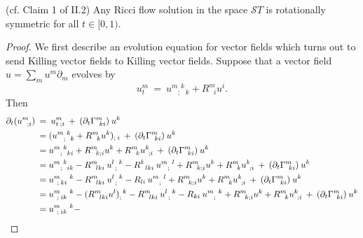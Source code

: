 \begin{lemma}
  \label{lem:kl-rotational-symmetry-standard-solutions-standard-solutions-lemma}
 (cf. Claim 1 of II.2)
Any Ricci flow solution in the space ${\mathcal ST}$ is
rotationally symmetric for all $t \in [0,1)$.
\end{lemma}
\begin{proof}
We first describe an evolution equation for vector fields which
turns out to send Killing vector fields to Killing vector fields.
Suppose that a vector field $u = \sum_m u^m \partial_m$ evolves by
\begin{equation} \label{Killingevolution}
u^m_t \: = \:
u^{m \: \: k}_{\: \: \: \: ;\: \: \:  k} + R^m_{\: \: \: i} u^i.
\end{equation}
Then
\begin{align} \label{bigmess1}
\partial_t (u^m_{\: \: \: ; i}) \: & = \:  u^m_{t \: ; i} \: + \:
(\partial_t \Gamma^m_{\: \: ki}) \: u^k \\
& = (u^{m \: \: k}_{\: \:
\: \: ;\: \: \:  k} + R^m_{\: \: \: k} u^k)_{; \: i} \: + \:
(\partial_t \Gamma^m_{\: \: ki}) \: u^k \notag \\
& = u^{m \: \: k}_{\: \: \: \: ;\: \: \:  ki} + R^m_{\: \: \: k;i} u^k +
R^m_{\: \: \: k} u^k_{\: \: ;i} \: + \:
(\partial_t \Gamma^m_{\: \: ki}) \: u^k \notag \\
& = u^{m \: \: k}_{\: \: \: \: ;\: \: \:  ik} -
R^m_{\: \: \: lki} \: u^{l \: \: \: k}_{\: \: ;} - R^k_{\: \: \: lki} \:
u^{m \: \: \: l}_{\: \: \: \: ;}
+ R^m_{\: \: \: k;i} u^k +
R^m_{\: \: \: k} u^k_{\: \: ;i} \: + \:
(\partial_t \Gamma^m_{\: \: ki}) \: u^k \notag \\
& = u^{m \: \: \: \: \: \: k}_{\: \: ;\:ki} -
R^m_{\: \: \: lki} \: u^{l \: \: \: k}_{\: \: ;} - R_{li} \:
u^{m \: \: \: l}_{\: \: \: \: ;}
+ R^m_{\: \: \: k;i} u^k +
R^m_{\: \: \: k} u^k_{\: \: ;i} \: + \:
(\partial_t \Gamma^m_{\: \: ki}) \: u^k \notag \\
& = u^{m \: \: \: \: \: \: k}_{\: \: ;\:ik} -
(R^m_{\: \: \: lki} u^l)_;^{\: \: k} -
R^m_{\: \: \: lki} \: u^{l \: \: \: k}_{\: \: ;} - R_{ki} \:
u^{m \: \: \: k}_{\: \: \: \: ;}
+ R^m_{\: \: \: k;i} u^k +
R^m_{\: \: \: k} u^k_{\: \: ;i} \: + \:
(\partial_t \Gamma^m_{\: \: ki}) \: u^k \notag \\
& = u^{m \: \: \: \: \: \: k}_{\: \: ;\:ik} -

\end{align}
\end{proof}
